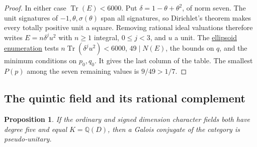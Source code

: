 \documentclass[11pt,reqno]{amsart}
\newcommand{\codecheck}[2]{\href{https://github.com/sebastienpalcoux/grothendieck-ring-classification/blob/d5750105bb5758f3ad38d2e5464dfcc12c019816/supplements/rank6/sphericality/#1}{#2}}
\newtheorem{proposition}[theorem]{Proposition}
\theoremstyle{remark}\newtheorem{remark}[theorem]{Remark}
\numberwithin{equation}{section}
\begin{document}
\begin{proof}
In either case $\operatorname{Tr}(E)<6000$. Put
$\delta=1-\theta+\theta^2$, of norm seven. The unit signatures of
$-1,\theta,\sigma(\theta)$ span all signatures, so Dirichlet's theorem
makes every totally positive unit a square. Removing rational ideal
valuations therefore writes $E=n\delta^j u^2$ with $n\ge1$ integral,
$0\le j<3$, and $u$ a unit. The
\codecheck{odd_degree_checks/cubic_height_check.py}{ellipsoid enumeration}
tests $n\operatorname{Tr}(\delta^ju^2)<6000$, $49\mid N(E)$, the
bounds on $q$, and the minimum conditions on $p_0,q_0$. It gives the
last column of the table. The smallest $P(p)$ among the seven remaining
values is $9/49>1/7$.
\end{proof}

\subsection{The quintic field and its rational complement}
\begin{proposition}\label{prop:odd-quintic-arithmetic}
If the ordinary and signed dimension character fields both have
degree five and equal $K=\mathbb Q(D)$, then a Galois conjugate of
the category is pseudo-unitary.
\end{proposition}
\end{document}
